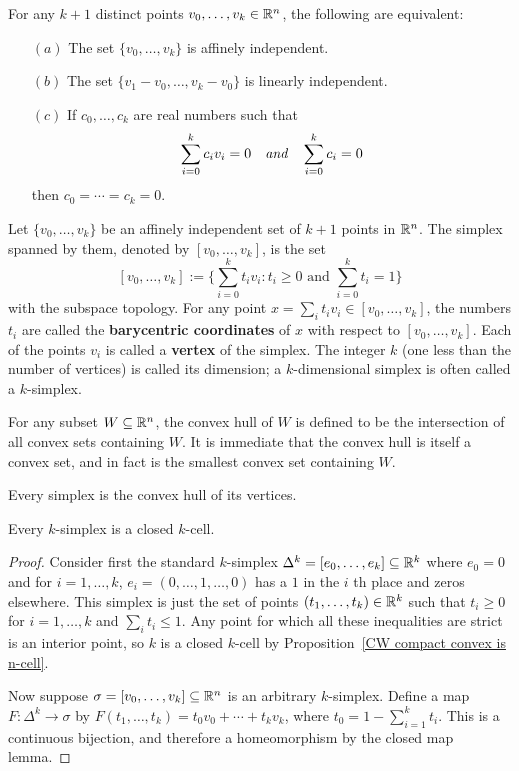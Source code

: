 \begin{proposition}
For any $k+1$ distinct points $v_0,\dots,v_k\in\mathbb{R}^n$, the following are equivalent:
\begin{itemize}
\item[$(a)$] The set $\{v_0,\dots,v_k\}$ is affinely independent.
\item[$(b)$] The set $\{v_1-v_0,\dots,v_k-v_0\}$ is linearly independent.
\item[$(c)$] If $c_0,\dots,c_k$ are real numbers such that
\[\sum_{i=0}^{k}c_iv_i=0\quad\textit{and}\quad \sum_{i=0}^{k}c_i=0\]
then $c_0=\cdots=c_k=0$.
\end{itemize}
\end{proposition}
Let $\{v_0,\dots,v_k\}$ be an affinely independent set of $k+1$ points in $\mathbb{R}^n$. The simplex spanned by them, denoted by $[v_0,\dots,v_k]$, is the set
\[[v_0,\dots,v_k]:=\{\sum_{i=0}^{k}t_iv_i:t_i\geq 0\text{ and }\sum_{i=0}^{k}t_i=1\}\]
with the subspace topology. For any point $x=\sum_{i}t_iv_i\in[v_0,\dots,v_k]$, the numbers $t_i$ are called the \textbf{barycentric coordinates} of $x$ with respect to $[v_0,\dots,v_k]$. Each of the points $v_i$ is called a \textbf{vertex} of the simplex. The integer $k$ (one less than the number of vertices) is called its dimension; a $k$-dimensional simplex is often called a $k$-simplex.\par
For any subset $W\subseteq\mathbb{R}^n$, the convex hull of $W$ is defined to be the intersection of all convex sets containing $W$. It is immediate that the convex hull is itself a convex set, and in fact is the smallest convex set containing $W$.
\begin{proposition}
Every simplex is the convex hull of its vertices.
\end{proposition}
\begin{proposition}
Every $k$-simplex is a closed $k$-cell.
\end{proposition}
\begin{proof}
Consider first the standard $k$-simplex $\Delta^k=[e_0,\dots,e_k]\subseteq\mathbb{R}^k$ where $e_0=0$ and for $i=1,\dots,k$, $e_i=(0,\dots,1,\dots,0)$ has a $1$ in the $i$ th place and zeros elsewhere. This simplex is just the set of points $(t_1,\dots,t_k)\in\mathbb{R}^k$ such that $t_i\geq0$ for $i=1,\dots,k$ and $\sum_it_i\leq1$. Any point for which all these inequalities are strict is an
interior point, so $k$ is a closed $k$-cell by Proposition~\ref{CW compact convex is n-cell}.\par
Now suppose $\sigma=[v_0,\dots,v_k]\subseteq\mathbb{R}^n$ is an arbitrary $k$-simplex. Define a map $F:\Delta^k\to\sigma$ by $F(t_1,\dots,t_k)=t_0v_0+\cdots+t_kv_k$, where $t_0=1-\sum_{i=1}^{k}t_i$. This is a continuous bijection, and therefore a homeomorphism by the closed map lemma.
\end{proof}
